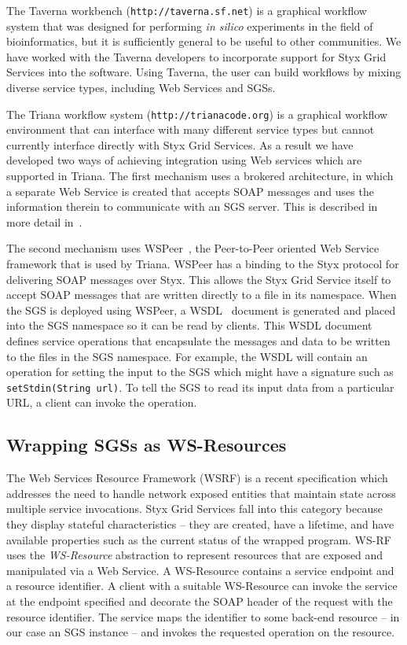 \documentclass[a4paper]{article}
\begin{document}
The Taverna workbench (\texttt{http://taverna.sf.net}) is a graphical workflow system that was designed for performing {\it in silico} experiments in the field of bioinformatics, but it is sufficiently general to be useful to other communities.  We have worked with the Taverna developers to incorporate support for Styx Grid Services into the software.  Using Taverna, the user can build workflows by mixing diverse service types, including Web Services and SGSs.

The Triana workflow system (\texttt{http://trianacode.org}) is a graphical workflow environment that can interface with many different service types but cannot currently interface directly with Styx Grid Services.  As a result we have developed two ways of achieving integration using Web services which are supported in Triana. The first mechanism uses a brokered architecture, in which a separate Web Service is created that accepts SOAP messages and uses the information therein to communicate with an SGS server. This is described in more detail in~\cite{blower:2005}.

The second mechanism uses WSPeer~\cite{wspeer}, the Peer-to-Peer oriented Web Service framework that is used by Triana. WSPeer has a binding to the Styx protocol for delivering SOAP messages over Styx. This allows the Styx Grid Service itself to accept SOAP messages that are written directly to a file in its namespace.  When the SGS is deployed using WSPeer, a WSDL~\cite{WSDL} document is generated and placed into the SGS namespace so it can be read by clients. This WSDL document defines service operations that encapsulate the messages and data to be written to the files in the SGS namespace. For example, the WSDL will contain an operation for setting the input to the SGS which might have a signature such as  \texttt{setStdin(String url)}. To tell the SGS to read its input data from a particular URL, a client can invoke the operation. 

\subsection{Wrapping SGSs as WS-Resources}\label{subsec:ws-resources}

The Web Services Resource Framework (WSRF) is a recent specification which addresses the need to handle network exposed entities that maintain state across multiple service invocations. Styx Grid Services fall into this category because they display stateful characteristics -- they are created, have a lifetime, and have available properties such as the current status of the wrapped program. WS-RF uses the \textit{WS-Resource} abstraction to represent resources that are exposed and manipulated via a Web Service. A WS-Resource contains a service endpoint and a resource identifier. A client with a suitable WS-Resource can invoke the service at the endpoint specified and decorate the SOAP header of the request with the resource identifier. The service maps the identifier to some back-end resource -- in our case an SGS instance -- and invokes the requested operation on the resource.
\end{document}
